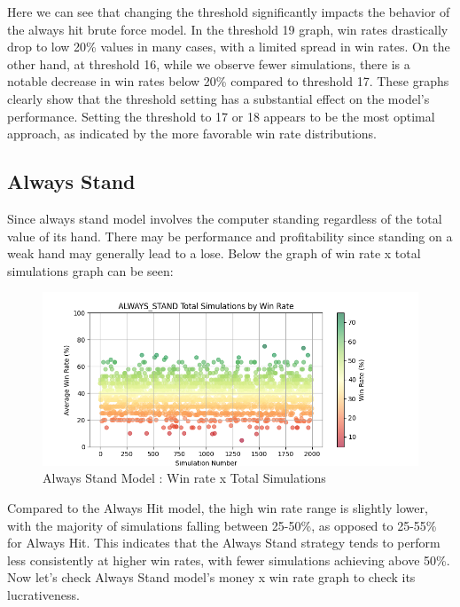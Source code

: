 \documentclass[a4paper,12pt]{report}
\begin{document}
Here we can see that changing the threshold significantly impacts the behavior of the always hit brute force model. In the threshold 19 graph, win rates drastically drop to low 20\% values in many cases, with a limited spread in win rates. On the other hand, at threshold 16, while we observe fewer simulations, there is a notable decrease in win rates below 20\% compared to threshold 17. These graphs clearly show that the threshold setting has a substantial effect on the model's performance. Setting the threshold to 17 or 18 appears to be the most optimal approach, as indicated by the more favorable win rate distributions.


\subsection{Always Stand}
Since always stand model involves the computer standing  regardless of the total value of its hand. There may be performance and profitability since standing on a weak hand may generally lead to a lose. Below the graph of win rate x total simulations graph can be seen:

\begin{figure}[h]
\begin{center}
\includegraphics[scale=0.6]{figures/graphs/as_wr_ts.png}
\end{center}
\caption{Always Stand Model : Win rate x Total Simulations}
\label{fig:ah_wr_ts}
\end{figure}

Compared to the Always Hit model, the high win rate range is slightly lower, with the majority of simulations falling between 25-50\%, as opposed to 25-55\% for Always Hit. This indicates that the Always Stand strategy tends to perform less consistently at higher win rates, with fewer simulations achieving above 50\%. Now let's check Always Stand model's money x win rate graph to check its lucrativeness.
\end{document}
